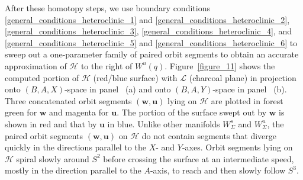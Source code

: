 \documentclass{ws-ijbc}
\begin{document}
After these homotopy steps, we use boundary conditions \eqref{general_conditions_heteroclinic_1} and \eqref{general_conditions_heteroclinic_2}, \eqref{general_conditions_heteroclinic_3}, \eqref{general_conditions_heteroclinic_4}, and \eqref{general_conditions_heteroclinic_5} and \eqref{general_conditions_heteroclinic_6} to sweep out a one-parameter family of paired orbit segments to obtain an accurate approximation of $\mathscr{H}$ to the right of $W^u(q)$.  Figure~\ref{figure_11} shows the computed portion of $\mathscr{H}$ (red/blue surface) with $\mathscr{L}$ (charcoal plane) in projection onto $(B,A,X)$-space in panel~ (a) and onto $(B,A,Y)$-space in panel~ (b).  Three concatenated orbit segments $(\mathbf{w},\mathbf{u})$ lying on $\mathscr{H}$ are plotted in forest green for $\mathbf{w}$ and magenta for $\mathbf{u}$.  The portion of the surface swept out by $\mathbf{w}$ is shown in red and that by $\mathbf{u}$ in blue.  Unlike other manifolds $W^s_\Sigma$ and $W^u_\Sigma$, the paired orbit segments $(\mathbf{w},\mathbf{u})$ on $\mathscr{H}$ do not contain segments that diverge quickly in the directions parallel to the $X$- and $Y$-axes.  Orbit segments lying on $\mathscr{H}$ spiral slowly around $S^2$ before crossing the surface at an intermediate speed, mostly in the direction parallel to the $A$-axis, to reach and then slowly follow $S^3$.
\end{document}
